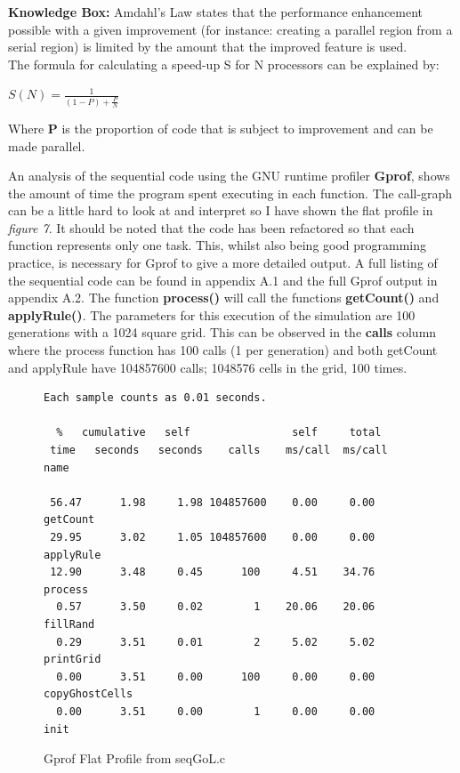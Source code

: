 \documentclass[11pt]{article} %
\begin{document}
\bigskip
\begin{mdframed}
{\bf Knowledge Box:} Amdahl's Law states that the performance enhancement possible with a given improvement (for instance: creating a parallel region from a serial region) is limited by the amount that the improved feature is used. \cite[p51]{ref10}\\ The formula for calculating a speed-up S for N processors can be explained by:\bigskip

\centerline{$ S(N) = \frac{1}{(1-P) + \frac{P}{N}} $}
\smallskip
Where {\bf P} is the proportion of code that is subject to improvement and can be made parallel.
\end{mdframed}
\bigskip
An analysis of the sequential code using the GNU runtime profiler {\bf Gprof}, shows the amount of time the program spent executing in each function. The call-graph can be a little hard to look at and interpret so I have shown the flat profile in {\it figure 7}. It should be noted that the code has been refactored so that each function represents only one task. This, whilst also being good programming practice, is necessary for Gprof to give a more detailed output. A full listing of the sequential code can be found in appendix A.1 and the full Gprof output in appendix A.2. The function {\bf process()} will call the functions {\bf getCount()} and {\bf applyRule()}. The parameters for this execution of the simulation are 100 generations with a 1024 square grid. This can be observed in the {\bf calls} column where the process function has 100 calls (1 per generation) and both getCount and applyRule have 104857600 calls; 1048576 cells in the grid, 100 times.
\begin{figure}[h]
\caption{Gprof Flat Profile from seqGoL.c}
\begin{verbatim}Each sample counts as 0.01 seconds.

  %   cumulative   self                self     total           
 time   seconds   seconds    calls    ms/call  ms/call  name    

 56.47      1.98     1.98 104857600    0.00     0.00    getCount
 29.95      3.02     1.05 104857600    0.00     0.00    applyRule
 12.90      3.48     0.45      100     4.51    34.76    process
  0.57      3.50     0.02        1    20.06    20.06    fillRand
  0.29      3.51     0.01        2     5.02     5.02    printGrid
  0.00      3.51     0.00      100     0.00     0.00    copyGhostCells
  0.00      3.51     0.00        1     0.00     0.00    init
\end{verbatim}
\end{figure}
\end{document}
